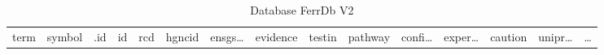 \documentclass[
]{article}
\begin{document}
\begin{longtable}[]{@{}lllllllllllllll@{}}
\caption{\label{tab:database-FerrDb-V2}Database FerrDb V2}\tabularnewline
\toprule
\begin{minipage}[b]{0.05\columnwidth}\raggedright
term\strut
\end{minipage} & \begin{minipage}[b]{0.04\columnwidth}\raggedright
symbol\strut
\end{minipage} & \begin{minipage}[b]{0.04\columnwidth}\raggedright
.id\strut
\end{minipage} & \begin{minipage}[b]{0.02\columnwidth}\raggedright
id\strut
\end{minipage} & \begin{minipage}[b]{0.05\columnwidth}\raggedright
rcd\strut
\end{minipage} & \begin{minipage}[b]{0.05\columnwidth}\raggedright
hgncid\strut
\end{minipage} & \begin{minipage}[b]{0.05\columnwidth}\raggedright
ensgs\ldots{}\strut
\end{minipage} & \begin{minipage}[b]{0.05\columnwidth}\raggedright
evidence\strut
\end{minipage} & \begin{minipage}[b]{0.04\columnwidth}\raggedright
testin\strut
\end{minipage} & \begin{minipage}[b]{0.05\columnwidth}\raggedright
pathway\strut
\end{minipage} & \begin{minipage}[b]{0.05\columnwidth}\raggedright
confi\ldots{}\strut
\end{minipage} & \begin{minipage}[b]{0.05\columnwidth}\raggedright
exper\ldots{}\strut
\end{minipage} & \begin{minipage}[b]{0.05\columnwidth}\raggedright
caution\strut
\end{minipage} & \begin{minipage}[b]{0.05\columnwidth}\raggedright
unipr\ldots{}\strut
\end{minipage} & \begin{minipage}[b]{0.02\columnwidth}\raggedright
\ldots{}\strut
\end{minipage}\tabularnewline

\end{longtable}
\end{document}
